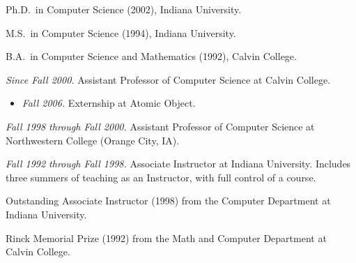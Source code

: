 \documentclass[ComputerScience]{vita}
\begin{document}
\begin{vita}



\begin{Degrees}
\item Ph.D.\ in Computer Science (2002), Indiana University.
\item M.S.\ in Computer Science (1994), Indiana University.
\item B.A.\ in Computer Science and Mathematics (1992), Calvin College.
\end{Degrees}




\begin{Experience}

\item \emph{Since Fall 2000.}  Assistant Professor of Computer Science at Calvin College.
  \begin{itemize}
  \item \emph{Fall 2006.}  Externship at Atomic Object.
  \end{itemize}

\item \emph{Fall 1998 through Fall 2000.}  Assistant Professor of Computer Science at Northwestern College (Orange City, IA).

\item \emph{Fall 1992 through Fall 1998.}  Associate Instructor at Indiana University.  Includes three summers of teaching as an Instructor, with full control of a course.


\end{Experience}




\begin{Honors}

\item Outstanding Associate Instructor (1998) from the Computer Department at Indiana University.

\item Rinck Memorial Prize (1992) from the Math and Computer Department at Calvin College.

\end{Honors}



\end{vita}
\end{document}
